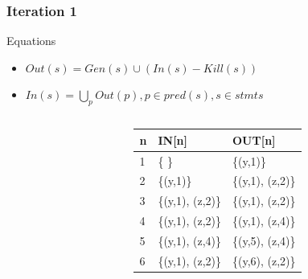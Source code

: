\begin{frame}[fragile, t]
 \frametitle{Iteration 1} 

\begin{center}
\begin{scriptsize}
\begin{minipage}{8cm}
    \begin{block}{Equations}
    \begin{itemize}
        \item $Out(s) = Gen(s) \cup (In(s) - Kill(s))$  
	    \item $In(s) = \bigcup_p Out(p), p \in pred(s), s \in stmts$
    \end{itemize}
    \end{block}
\end{minipage}
\end{scriptsize}
\end{center}

\begin{columns}[T]
\begin{column}[T]{.4\textwidth}
    \vspace{0pt}
    
    \end{column}
    \begin{column}[T]{.6\textwidth}
\vspace{30pt}    
	\begin{scriptsize}
	   \begin{table}[]
\begin{tabular}{|l|l|l|}
\hline
n & IN{[}n{]} & OUT{[}n{]} \\ \hline
1  & \pause \{ \}            & \pause \{(y,1)\} \\ \hline
2  & \pause \{(y,1)\}        & \pause \{(y,1), (z,2)\} \\ \hline
3  & \pause \{(y,1), (z,2)\} & \pause \{(y,1), (z,2)\} \\ \hline
4  & \pause \{(y,1), (z,2)\} & \pause \{(y,1), (z,4)\} \\ \hline
5  & \pause \{(y,1), (z,4)\} & \pause \{(y,5), (z,4)\} \\ \hline
6  & \pause \{(y,1), (z,2)\} & \pause \{(y,6), (z,2)\} \\ \hline
\end{tabular}
\end{table}   
	\end{scriptsize}
	\end{column}
    
\end{columns}

\end{frame}



